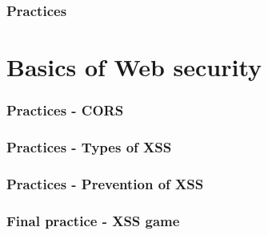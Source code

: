 \documentclass[english,10pt]{book}
\newif\ifSOLS
\begin{document}
\subsection{Practices}



\chapter{Basics of Web security\label{chap:web-sec}}




\subsection{Practices - CORS}



\subsection{Practices - Types  of XSS}






\subsection{Practices - Prevention of XSS}


\subsection{Final practice - XSS game}


\ifSOLS
\chapter{Answers to Practices}
\shipoutExercise
\vspace{0.5cm}
\shipoutAnswer
\fi


%
% 
\end{document}
